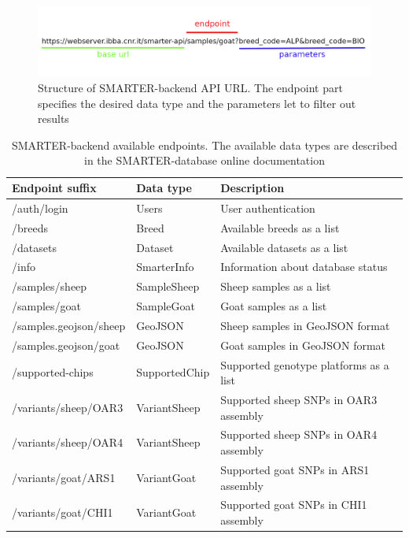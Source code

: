 \documentclass[a4paper,num-refs,gigabyte]{oup-contemporary}
\begin{document}
\begin{figure}
\centering
\includegraphics[width=.45\textwidth]{backend_URL.png}
\caption{Structure of SMARTER-backend API URL. The endpoint part specifies the desired data type and the parameters let to filter out results}
\label{fig:backend_url}
\end{figure}

\begin{table}
\caption{SMARTER-backend available endpoints. The available data types are described in the SMARTER-database online documentation\citep{SMARTERdocs}}
\label{tab:endpoints}
\begin{center}
\begin{tabular}{l l l}
\toprule
Endpoint suffix & Data type & Description \\
\midrule
/auth/login & Users & User authentication \\
/breeds & Breed & Available breeds as a list \\
/datasets & Dataset & Available datasets as a list \\
/info & SmarterInfo & Information about database status \\
/samples/sheep & SampleSheep & Sheep samples as a list \\
/samples/goat & SampleGoat & Goat samples as a list \\
/samples.geojson/sheep & GeoJSON & Sheep samples in GeoJSON format \\
/samples.geojson/goat & GeoJSON & Goat samples in GeoJSON format \\
/supported-chips & SupportedChip & Supported genotype platforms as a list \\
/variants/sheep/OAR3 & VariantSheep & Supported sheep SNPs in OAR3 assembly \\
/variants/sheep/OAR4 & VariantSheep & Supported sheep SNPs in OAR4 assembly \\
/variants/goat/ARS1 & VariantGoat & Supported goat SNPs in ARS1 assembly \\
/variants/goat/CHI1 & VariantGoat & Supported goat SNPs in CHI1 assembly \\
\bottomrule
\end{tabular}
\end{center}
\end{table}
\end{document}
